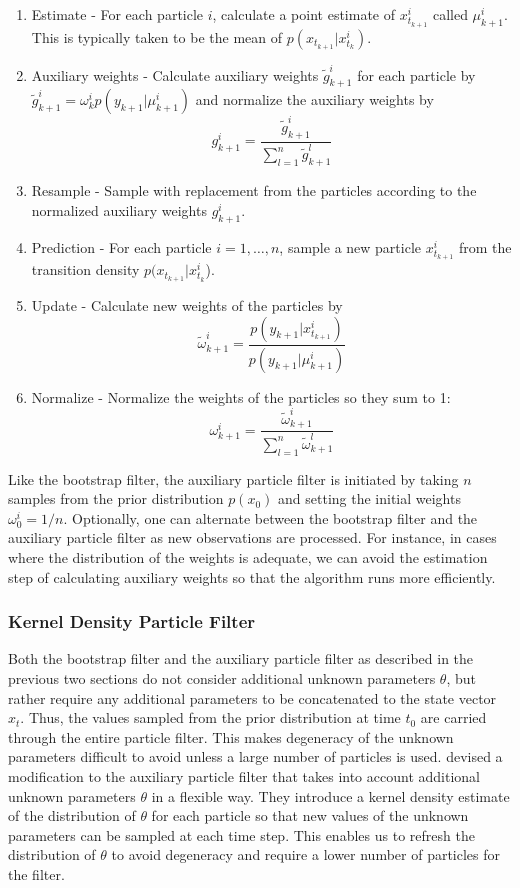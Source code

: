 \documentclass{article}
\begin{document}
\begin{enumerate}
\item Estimate - For each particle $i$, calculate a point estimate of $x_{t_{k+1}}^i$ called $\mu_{k+1}^i$.  This is typically taken to be the mean of $p(x_{t_{k+1}}|x_{t_k}^i)$.
\item Auxiliary weights - Calculate auxiliary weights $\tilde{g}_{k+1}^i$ for each particle by $\tilde{g}_{k+1}^i = \omega_k^i p(y_{k+1}|\mu_{k+1}^i)$ and normalize the auxiliary weights by \[g_{k+1}^i = \frac{\tilde{g}_{k+1}^i}{\sum_{l=1}^n \tilde{g}_{k+1}^l}\]
\item Resample - Sample with replacement from the particles according to the normalized auxiliary weights $g_{k+1}^i$.
\item Prediction - For each particle $i = {1,\ldots,n}$, sample a new particle $x_{t_{k+1}}^i$ from the transition density $p(x_{t_{k+1}}|x_{t_k}^i$).
\item Update - Calculate new weights of the particles by \[\tilde{\omega}_{k+1}^i = \frac{p(y_{k+1}|x_{t_{k+1}}^i)}{p(y_{k+1}|\mu_{k+1}^i)}\]
\item Normalize - Normalize the weights of the particles so they sum to 1: \[\omega_{k+1}^i = \frac{\tilde{\omega}_{k+1}^i}{\sum_{l=1}^n \tilde{\omega}_{k+1}^l}\]
\end{enumerate}

\noindent Like the bootstrap filter, the auxiliary particle filter is initiated by taking $n$ samples from the prior distribution $p(x_0)$ and setting the initial weights $\omega_0^i = 1/n$.  Optionally, one can alternate between the bootstrap filter and the auxiliary particle filter as new observations are processed.  For instance, in cases where the distribution of the weights is adequate, we can avoid the estimation step of calculating auxiliary weights so that the algorithm runs more efficiently.

\subsubsection{Kernel Density Particle Filter}

Both the bootstrap filter and the auxiliary particle filter as described in the previous two sections do not consider additional unknown parameters $\theta$, but rather require any additional parameters to be concatenated to the state vector $x_t$.  Thus, the values sampled from the prior distribution at time $t_0$ are carried through the entire particle filter.  This makes degeneracy of the unknown parameters difficult to avoid unless a large number of particles is used.  \citet{liu} devised a modification to the auxiliary particle filter that takes into account additional unknown parameters $\theta$ in a flexible way.  They introduce a kernel density estimate of the distribution of $\theta$ for each particle so that new values of the unknown parameters can be sampled at each time step.  This enables us to refresh the distribution of $\theta$ to avoid degeneracy and require a lower number of particles for the filter.
\end{document}
